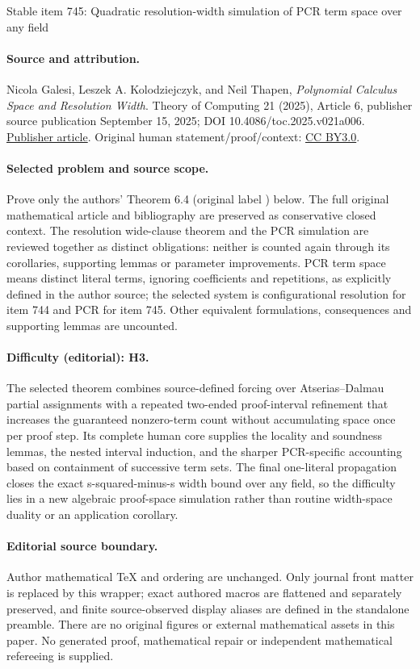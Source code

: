 \documentclass[11pt]{article}
\numberwithin{equation}{section}
\theoremstyle{definition}
\theoremstyle{plain}
\begin{document}
\begin{center}{\Large Stable item 745: Quadratic resolution-width simulation of PCR term space over any field}\end{center}
\paragraph{Source and attribution.}
Nicola Galesi, Leszek A. Kolodziejczyk, and Neil Thapen, \emph{Polynomial Calculus Space and Resolution Width}. Theory of Computing 21 (2025), Article 6, publisher source publication September 15, 2025; DOI 10.4086/toc.2025.v021a006. \href{https://theoryofcomputing.org/articles/v021a006/}{Publisher article}. Original human statement/proof/context: \href{https://creativecommons.org/licenses/by/3.0/}{CC BY3.0}.
\paragraph{Selected problem and source scope.}
Prove only the authors' Theorem 6.4 (original label ) below. The full original mathematical article and bibliography are preserved as conservative closed context. The resolution wide-clause theorem and the PCR simulation are reviewed together as distinct obligations: neither is counted again through its corollaries, supporting lemmas or parameter improvements. PCR term space means distinct literal terms, ignoring coefficients and repetitions, as explicitly defined in the author source; the selected system is configurational resolution for item 744 and PCR for item 745.  Other equivalent formulations, consequences and supporting lemmas are uncounted.
\paragraph{Difficulty (editorial): H3.}
The selected theorem combines source-defined forcing over Atserias--Dalmau partial assignments with a repeated two-ended proof-interval refinement that increases the guaranteed nonzero-term count without accumulating space once per proof step. Its complete human core supplies the locality and soundness lemmas, the nested interval induction, and the sharper PCR-specific accounting based on containment of successive term sets. The final one-literal propagation closes the exact s-squared-minus-s width bound over any field, so the difficulty lies in a new algebraic proof-space simulation rather than routine width-space duality or an application corollary.
\paragraph{Editorial source boundary.}
Author mathematical TeX and ordering are unchanged. Only journal front matter is replaced by this wrapper; exact authored macros are flattened and separately preserved, and finite source-observed display aliases are defined in the standalone preamble. There are no original figures or external mathematical assets in this paper.  No generated proof, mathematical repair or independent mathematical refereeing is supplied. 
\clearpage
\end{document}
